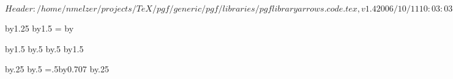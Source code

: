 \ProvidesFileRCS[v\pgfversion] $Header: /home/nmelzer/projects/TeX/pgf/generic/pgf/libraries/pgflibraryarrows.code.tex,v 1.4 2006/10/11 10:03:03 tantau Exp $

%



\pgfarrowsdeclare{[}{]}
{
  \@tempdima=1pt%
  \advance\@tempdima by1.25\pgflinewidth%
  \pgfarrowsleftextend{-\@tempdima}
  \pgfarrowsrightextend{.5\pgflinewidth}
}
{
  \@tempdima=2pt%
  \advance\@tempdima by1.5\pgflinewidth%
  \@tempdimb=\@tempdima%
  \advance\@tempdimb by\pgflinewidth%
  \pgfsetdash{}{0pt}
  \pgfsetmiterjoin
  \pgfsetbuttcap
  \pgfpathlineto{\pgfpoint{0pt}{-\@tempdima}}
  \pgfpathlineto{\pgfpoint{0pt}{\@tempdima}}
  \pgfusepathqstroke
}

\pgfarrowsdeclarereversed{]}{[}{[}{]}



\pgfarrowsdeclare{(}{)}
{
  \@tempdima=2pt%
  \advance\@tempdima by1.5\pgflinewidth%
  \@tempdima\advance\@tempdimb by.5\pgflinewidth%
  \pgfarrowsrightextend{\@tempdimb}
  \@tempdima\advance\@tempdimb by.5\pgflinewidth%
  \pgfarrowsleftextend{-\@tempdimb}
}
{
  \@tempdima=2pt%
  \advance\@tempdima by1.5\pgflinewidth%
  \pgfsetdash{}{0pt}
  \pgfsetroundcap
  \pgfpathcurveto
  {}
  {}
  {}
  \pgfusepathqstroke
}

\pgfarrowsdeclarereversed{)}{(}{(}{)}





{
  \@tempdima=0.3pt%
  \advance\@tempdima by.25\pgflinewidth%
  \@tempdima\advance\@tempdimb by.5\pgflinewidth%
  \pgfarrowsleftextend{-\@tempdimb}
  \@tempdimb=.5\@tempdima\advance\@tempdimb by0.707\pgflinewidth%
  \pgfarrowsrightextend{\@tempdimb}
}
{
  \@tempdima=0.3pt%
  \advance\@tempdima by.25\pgflinewidth%
  \pgfsetdash{}{0pt}
  \pgfsetroundcap
  \pgfsetmiterjoin
  \pgfusepathqstroke
}

